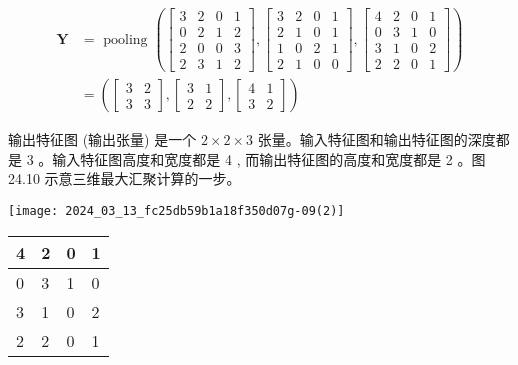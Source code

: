 \documentclass[10pt]{article}
\begin{document}
$$
\begin{aligned}
\boldsymbol{Y} & =\text { pooling }\left(\left[\begin{array}{llll}
3 & 2 & 0 & 1 \\
0 & 2 & 1 & 2 \\
2 & 0 & 0 & 3 \\
2 & 3 & 1 & 2
\end{array}\right],\left[\begin{array}{llll}
3 & 2 & 0 & 1 \\
2 & 1 & 0 & 1 \\
1 & 0 & 2 & 1 \\
2 & 1 & 0 & 0
\end{array}\right],\left[\begin{array}{llll}
4 & 2 & 0 & 1 \\
0 & 3 & 1 & 0 \\
3 & 1 & 0 & 2 \\
2 & 2 & 0 & 1
\end{array}\right]\right) \\
& =\left(\left[\begin{array}{ll}
3 & 2 \\
3 & 3
\end{array}\right],\left[\begin{array}{ll}
3 & 1 \\
2 & 2
\end{array}\right],\left[\begin{array}{ll}
4 & 1 \\
3 & 2
\end{array}\right]\right)
\end{aligned}
$$

输出特征图 (输出张量) 是一个 $2 \times 2 \times 3$ 张量。输入特征图和输出特征图的深度都是 3 。输入特征图高度和宽度都是 4 , 而输出特征图的高度和宽度都是 2 。图 24.10 示意三维最大汇聚计算的一步。

\begin{center}
\texttt{[image: 2024\_03\_13\_fc25db59b1a18f350d07g-09(2)]}
\end{center}

\begin{center}
\begin{tabular}{|l|l|l|l|}
\hline
4 & 2 & 0 & 1 \\
\hline
0 & 3 & 1 & 0 \\
\hline
3 & 1 & 0 & 2 \\
\hline
2 & 2 & 0 & 1 \\
\hline
\end{tabular}
\end{center}
\end{document}
